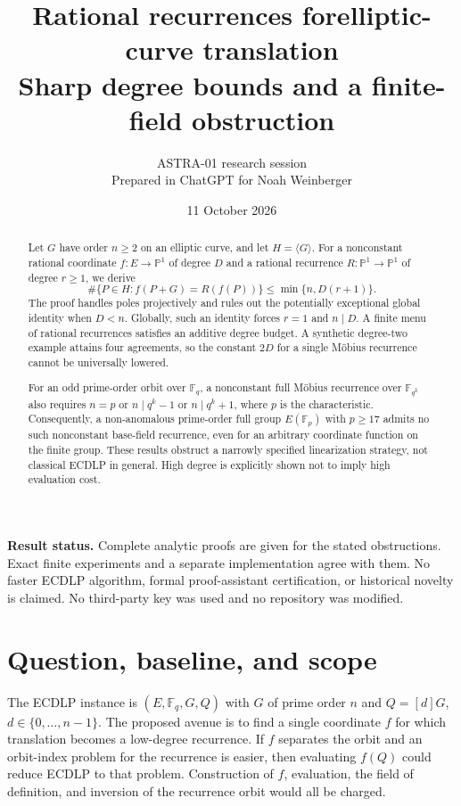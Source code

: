 \documentclass[11pt,letterpaper]{article}
\title{\vspace{-1.1cm}\textbf{Rational recurrences for\newline elliptic-curve translation}\\[5pt]
\large Sharp degree bounds and a finite-field obstruction}
\author{ASTRA-01 research session\\\small Prepared in ChatGPT for Noah Weinberger}
\date{11 October 2026}
\theoremstyle{definition}
\theoremstyle{remark}
\newcommand{\F}{\mathbb F}
\newcommand{\PP}{\mathbb P}
\begin{document}
\maketitle
\thispagestyle{fancy}
\begin{center}
\colorbox{blue!5}{\parbox{0.93\linewidth}{\textbf{Result status.} Complete analytic proofs are given for the stated obstructions. Exact finite experiments and a separate implementation agree with them. No faster ECDLP algorithm, formal proof-assistant certification, or historical novelty is claimed. No third-party key was used and no repository was modified.}}
\end{center}

\begin{abstract}
Let $G$ have order $n\ge2$ on an elliptic curve, and let $H=\langle G\rangle$. For a nonconstant rational coordinate $f:E\to\PP^1$ of degree $D$ and a rational recurrence $R:\PP^1\to\PP^1$ of degree $r\ge1$, we derive
\[
\#\{P\in H:f(P+G)=R(f(P))\}\le\min\{n,D(r+1)\}.
\]
The proof handles poles projectively and rules out the potentially exceptional global identity when $D<n$. Globally, such an identity forces $r=1$ and $n\mid D$. A finite menu of rational recurrences satisfies an additive degree budget. A synthetic degree-two example attains four agreements, so the constant $2D$ for a single M\"obius recurrence cannot be universally lowered.

For an odd prime-order orbit over $\F_q$, a nonconstant full M\"obius recurrence over $\F_{q^k}$ also requires $n=p$ or $n\mid q^k-1$ or $n\mid q^k+1$, where $p$ is the characteristic. Consequently, a non-anomalous prime-order full group $E(\F_p)$ with $p\ge17$ admits no such nonconstant base-field recurrence, even for an arbitrary coordinate function on the finite group. These results obstruct a narrowly specified linearization strategy, not classical ECDLP in general. High degree is explicitly shown not to imply high evaluation cost.
\end{abstract}

\section{Question, baseline, and scope}

The ECDLP instance is $(E,\F_q,G,Q)$ with $G$ of prime order $n$ and $Q=[d]G$, $d\in\{0,\ldots,n-1\}$. The proposed avenue is to find a single coordinate $f$ for which translation becomes a low-degree recurrence. If $f$ separates the orbit and an orbit-index problem for the recurrence is easier, then evaluating $f(Q)$ could reduce ECDLP to that problem. Construction of $f$, evaluation, the field of definition, and inversion of the recurrence orbit would all be charged.
\end{document}
